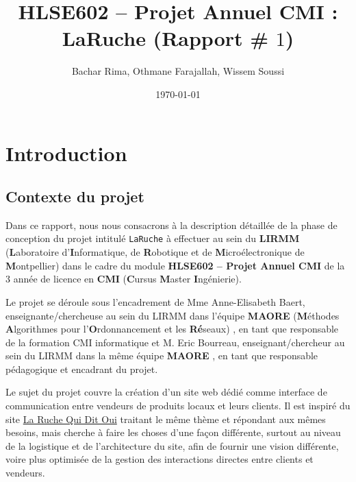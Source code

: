 \documentclass[a4paper,12pt]{book}
\title{\textbf{HLSE602 -- Projet Annuel CMI} : \textbf{LaRuche} (Rapport \# $1$)}
\author{Bachar Rima, Othmane Farajallah, Wissem Soussi}
\date{\today}
\theoremstyle{break}
\theoremstyle{break}
\theoremstyle{break}
\theoremstyle{break}
\theoremstyle{definition}
\theoremstyle{remark}
\begin{document}
\pagestyle{plain}

\maketitle

{
  \hypersetup{linkcolor=black}
  \tableofcontents
}

\chapter{Introduction}
\section{Contexte du projet}
Dans ce rapport, nous nous consacrons à la description détaillée de la phase de conception du projet intitulé \texttt{LaRuche} à effectuer au sein du \textbf{LIRMM} (\textbf{L}aboratoire d'\textbf{I}nformatique, de \textbf{R}obotique et de \textbf{M}icroélectronique de \textbf{M}ontpellier) dans le cadre du module \textbf{HLSE602 -- Projet Annuel CMI} de la $3$\ieme{} année de licence en \textbf{CMI} (\textbf{C}ursus \textbf{M}aster \textbf{I}ngénierie).

Le projet se déroule sous l'encadrement de Mme Anne-Elisabeth Baert, enseignante/chercheuse au sein du LIRMM dans l'équipe \textbf{MAORE} (\textbf{M}éthodes \textbf{A}lgorithmes pour l'\textbf{O}rdonnancement et les \textbf{Ré}seaux) \citep{AEBPres}, en tant que responsable de la formation CMI informatique et M. Eric Bourreau, enseignant/chercheur au sein du LIRMM dans la même équipe \textbf{MAORE} \citep{EricBourreauPres}, en tant que responsable pédagogique et encadrant du projet.

Le sujet du projet couvre la création d'un site web dédié comme interface de communication entre vendeurs de produits locaux et leurs clients. Il est inspiré du site \og \href{https://laruchequiditoui.fr/fr}{La Ruche Qui Dit Oui} \fg traitant le même thème et répondant aux mêmes besoins, mais cherche à faire les choses d'une façon différente, surtout au niveau de la logistique et de l'architecture du site, afin de fournir une vision différente, voire plus optimisée de la gestion des interactions directes entre clients et vendeurs.
\end{document}
